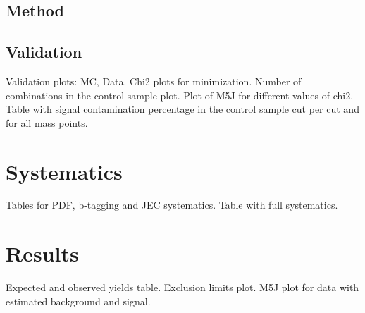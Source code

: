 \subsection{Method}
\label{sec:bkgmet}

\subsection{Validation}
\label{sec:val}

\begin{TOINCLUDE}Validation plots: MC, Data. Chi2 plots for minimization. Number of combinations in the control sample plot. Plot of M5J for different values of chi2. Table with signal contamination percentage in the control sample cut per cut and for all mass points.\end{TOINCLUDE}

\section{Systematics}
\label{sec:sys}

\begin{TOINCLUDE}Tables for PDF, b-tagging and JEC systematics. Table with full systematics.\end{TOINCLUDE}

\section{Results}
\label{sec:res}

\begin{TOINCLUDE}Expected and observed yields table. Exclusion limits plot. M5J plot for data with estimated background and signal.\end{TOINCLUDE}